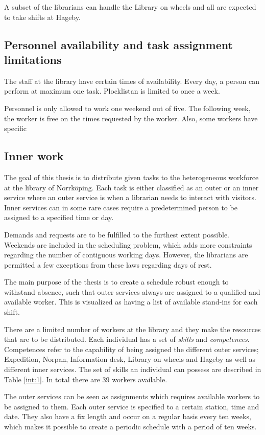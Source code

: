 A subset of the librarians can handle the Library on wheels and all are expected to take shifts at Hageby.

\subsection{Personnel availability and task assignment limitations}
The staff at the library have certain times of availability. Every day, a person can perform at maximum one task. Plocklistan is limited to once a week.

Personnel is only allowed to work one weekend out of five. The following week, the worker is free on the times requested by the worker. Also, some workers have specific 

\subsection{Inner work} 

The goal of this thesis is to distribute given tasks to the heterogeneous workforce at the library of Norrköping. Each task is either classified as an outer or an inner service where an outer service is when a librarian needs to interact with visitors. Inner services can in some rare cases require a predetermined person to be assigned to a specified time or day.

Demands and requests are to be fulfilled to the furthest extent possible. Weekends are included in the scheduling problem, which adds more constraints regarding the number of contiguous working days. However, the librarians are permitted a few exceptions from these laws regarding days of rest.

The main purpose of the thesis is to create a schedule robust enough to withstand absence, such that outer services always are assigned to a qualified and available worker. This is visualized as having a list of available stand-ins for each shift. 

There are a limited number of workers at the library and they make the resources that are to be distributed. Each individual has a set of \textit{skills} and \textit{competences}. Competences refer to the capability of being assigned the different outer services; Expedition, Norpan, Information desk, Library on wheels and Hageby as well as different inner services. The set of skills an individual can possess are described in Table \ref{int:1}. In total there are 39 workers available.

The outer services can be seen as assignments which requires available workers to be assigned to them. Each outer service is specified to a certain station, time and date. They also have a fix length and occur on a regular basis every ten weeks, which makes it possible to create a periodic schedule with a period of ten weeks. 


